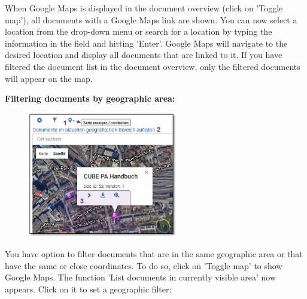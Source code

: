 When Google Maps is displayed in the document overview (click on 'Toggle map'), all documents with a Google Maps link are shown. You can now select a location from the drop-down menu  or search for a location  by typing the information in the field and hitting 'Enter'. Google Maps will navigate to the desired location and display all documents that are linked to it. If you have filtered the document list in the document overview, only the filtered documents will appear on the map. %

\pagebreak
\textbf{Filtering documents by geographic area:} \\

\begin{figure}
  \vspace{-35pt}
  \begin{center}
    \includegraphics[height=55mm]{../chapters/11_Dokumentenablage/pictures/11-2-3_GeoBereichFilter.jpg}
  \end{center}
  \vspace{-20pt}
  \vspace{-10pt}
\end{figure}
You have option to filter documents that are in the same geographic area or that have the same or close coordinates. To do so, click on 'Toggle map'  to show Google Maps. The function 'List documents in currently visible area'  now appears. Click on it to set a geographic filter:

\vspace{1.5cm} 

